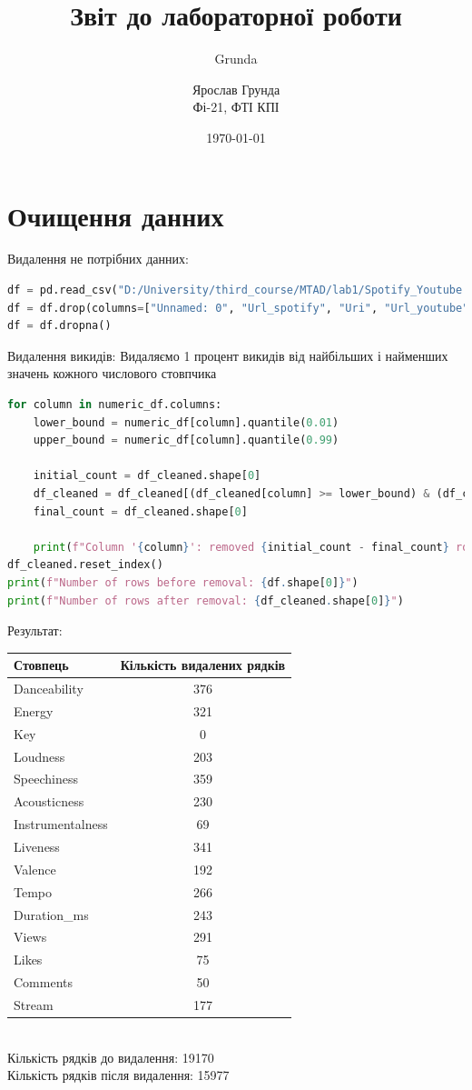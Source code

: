 \documentclass{article}
\author{Grunda}
\title{Звіт до лабораторної роботи}
\author{Ярослав Грунда \\ Фі-21, ФТІ КПІ}
\date{\today}
\begin{document}
\maketitle

\tableofcontents  
\newpage

\section{Очищення данних}
Видалення не потрібних данних:
\begin{lstlisting}[language=Python]
df = pd.read_csv("D:/University/third_course/MTAD/lab1/Spotify_Youtube.csv")
df = df.drop(columns=["Unnamed: 0", "Url_spotify", "Uri", "Url_youtube"])
df = df.dropna()
\end{lstlisting}

Видалення викидів:
Видаляємо 1 процент викидів від найбільших і найменших значень кожного числового стовпчика
\begin{lstlisting}[language=Python]
for column in numeric_df.columns:
    lower_bound = numeric_df[column].quantile(0.01)  
    upper_bound = numeric_df[column].quantile(0.99)  
    
    initial_count = df_cleaned.shape[0]
    df_cleaned = df_cleaned[(df_cleaned[column] >= lower_bound) & (df_cleaned[column] <= upper_bound)]
    final_count = df_cleaned.shape[0]
    
    print(f"Column '{column}': removed {initial_count - final_count} rows.")
df_cleaned.reset_index()
print(f"Number of rows before removal: {df.shape[0]}")
print(f"Number of rows after removal: {df_cleaned.shape[0]}")
\end{lstlisting}
Результат:\\
\begin{tabular}{|l|c|}
    \hline
    \textbf{Стовпець} & \textbf{Кількість видалених рядків} \\
    \hline
    Danceability & 376 \\
    Energy & 321 \\
    Key & 0 \\
    Loudness & 203 \\
    Speechiness & 359 \\
    Acousticness & 230 \\
    Instrumentalness & 69 \\
    Liveness & 341 \\
    Valence & 192 \\
    Tempo & 266 \\
    Duration\_ms & 243 \\
    Views & 291 \\
    Likes & 75 \\
    Comments & 50 \\
    Stream & 177 \\
    \hline
    \end{tabular}
    \\
    Кількість рядків до видалення: 19170 \\
    Кількість рядків після видалення: 15977
\end{document}
